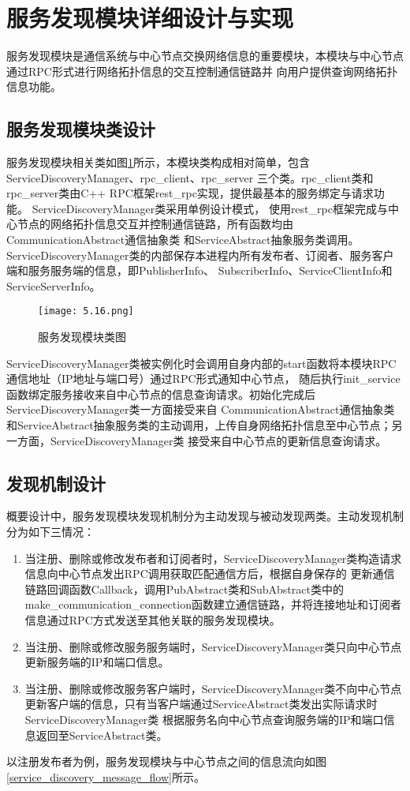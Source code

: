 \section{服务发现模块详细设计与实现}
服务发现模块是通信系统与中心节点交换网络信息的重要模块，本模块与中心节点通过RPC形式进行网络拓扑信息的交互控制通信链路并
向用户提供查询网络拓扑信息功能。

\subsection{服务发现模块类设计}
服务发现模块相关类如图\ref{service_discovery_class}所示，本模块类构成相对简单，包含ServiceDiscoveryManager、rpc\_client、rpc\_server
三个类。rpc\_client类和rpc\_server类由C++ RPC框架rest\_rpc实现，提供最基本的服务绑定与请求功能。
ServiceDiscoveryManager类采用单例设计模式，
使用rest\_rpc框架完成与中心节点的网络拓扑信息交互并控制通信链路，所有函数均由CommunicationAbstract通信抽象类
和ServiceAbstract抽象服务类调用。ServiceDiscoveryManager类的内部保存本进程内所有发布者、订阅者、服务客户端和服务服务端的信息，即PublisherInfo、
SubscriberInfo、ServiceClientInfo和ServiceServerInfo。

\begin{figure}[htb]
  \centering
  \texttt{[image: 5.16.png]}
  \caption{服务发现模块类图}
  \label{service_discovery_class}
\end{figure}

ServiceDiscoveryManager类被实例化时会调用自身内部的start函数将本模块RPC通信地址（IP地址与端口号）通过RPC形式通知中心节点，
随后执行init\_service函数绑定服务接收来自中心节点的信息查询请求。初始化完成后ServiceDiscoveryManager类一方面接受来自
CommunicationAbstract通信抽象类和ServiceAbstract抽象服务类的主动调用，上传自身网络拓扑信息至中心节点；另一方面，ServiceDiscoveryManager类
接受来自中心节点的更新信息查询请求。


\subsection{发现机制设计}
概要设计中，服务发现模块发现机制分为主动发现与被动发现两类。主动发现机制分为如下三情况：
\begin{enumerate}
  \item 当注册、删除或修改发布者和订阅者时，ServiceDiscoveryManager类构造请求信息向中心节点发出RPC调用获取匹配通信方后，根据自身保存的
  更新通信链路回调函数Callback，调用PubAbstract类和SubAbstract类中的make\_communication\_connection函数建立通信链路，并将连接地址和订阅者信息通过RPC方式发送至其他关联的服务发现模块。
  \item 当注册、删除或修改服务服务端时，ServiceDiscoveryManager类只向中心节点更新服务端的IP和端口信息。
  \item 当注册、删除或修改服务客户端时，ServiceDiscoveryManager类不向中心节点更新客户端的信息，只有当客户端通过ServiceAbstract类发出实际请求时ServiceDiscoveryManager类
  根据服务名向中心节点查询服务端的IP和端口信息返回至ServiceAbstract类。
\end{enumerate}
以注册发布者为例，服务发现模块与中心节点之间的信息流向如图\ref{service_discovery_message_flow}所示。

